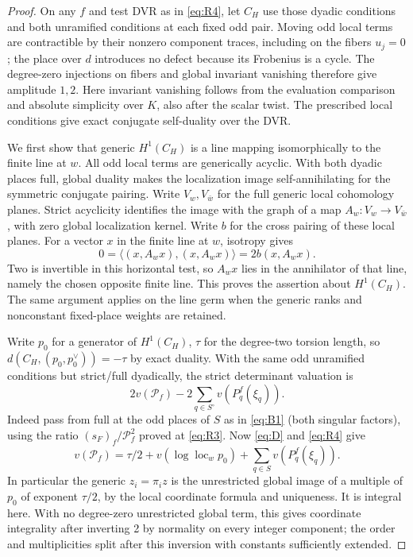 \begin{proof}
On any \(f\) and test DVR as in \eqref{eq:R4}, let \(C_H\) use
those dyadic conditions and both unramified conditions at each fixed
odd pair. Moving odd local terms are contractible by their nonzero
component traces, including on the fibers \(u_j=0\); the place
over \(d\) introduces no defect because its Frobenius is a cycle.
The degree-zero injections on fibers and global invariant vanishing
therefore give amplitude \(1,2\). Here invariant vanishing follows
from the evaluation comparison and absolute simplicity over \(K\),
also after the scalar twist. The prescribed local conditions give
exact conjugate self-duality over the DVR.

We first show that generic \(H^1(C_H)\) is a line mapping
isomorphically to the finite line at \(w\). All odd local terms are
generically acyclic. With both dyadic places full, global duality
makes the localization image self-annihilating for the symmetric
conjugate pairing. Write \(V_w,V_{\bar w}\) for the full generic
local cohomology planes. Strict acyclicity identifies the image with
the graph of a map \(A_w:V_w\to V_{\bar w}\), with zero global
localization kernel. Write \(b\) for the cross pairing of these
local planes. For a vector \(x\) in the finite line at \(w\),
isotropy gives
\[
 0=\langle(x,A_wx),(x,A_wx)\rangle=2b(x,A_wx).
\]
Two is invertible in this horizontal test, so \(A_wx\) lies in
the annihilator of that line, namely the chosen opposite finite
line. This proves the assertion about \(H^1(C_H)\). The same
argument applies on the line germ when the generic ranks and
nonconstant fixed-place weights are retained.

Write \(p_0\) for a generator of \(H^1(C_H)\), \(\tau\) for the degree-two torsion length, so \(d(C_H,(p_0,p_0^\vee))=-\tau\) by exact duality. With the same odd unramified conditions but strict/full dyadically, the strict determinant valuation is
\[
                2v(\mathcal P_f)-2\sum_{q\in S^\circ}v(P_q^f(\xi_q)).
\]
Indeed pass from full at the odd places of \(S\) as in \eqref{eq:B1} (both singular factors), using the ratio \((s_F)_f/\mathcal P_f^2\) proved at \eqref{eq:R3}. Now \eqref{eq:D} and \eqref{eq:R4} give
\[
 v(\mathcal P_f)=\tau/2+v(\log\operatorname{loc}_w p_0)
                             +\sum_{q\in S}v(P_q^f(\xi_q)).
\]
In particular the generic \(z_i=\pi_i z\) is the unrestricted global image of a multiple of \(p_0\) of exponent \(\tau/2\), by the local coordinate formula and uniqueness. It is integral here. With no degree-zero unrestricted global term, this gives coordinate integrality after inverting 2 by normality on every integer component; the order and multiplicities split after this inversion with constants sufficiently extended.


\end{proof}
